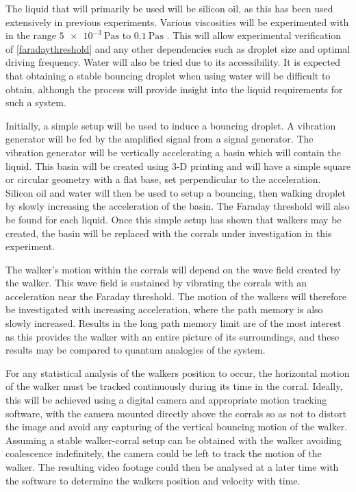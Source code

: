 \documentclass[11pt]{article}
\begin{document}
The liquid that will primarily be used will be silicon oil, as this has been used extensively in previous experiments.  Various viscosities will be experimented with in the range $\SI{5e-3}{\pascal\second}$ to $\SI{0.1}{\pascal\second}$ \cite{9}.  This will allow experimental verification of \eqref{faradaythreshold} and any other dependencies such as droplet size and optimal driving frequency.
Water will also be tried due to its accessibility.  It is expected that obtaining a stable bouncing droplet when using water will be difficult to obtain, although the process will provide insight into the liquid requirements for such a system.

Initially, a simple setup will be used to induce a bouncing droplet.  A vibration generator will be fed by the amplified signal from a signal generator.  The vibration generator will be vertically accelerating a basin which will contain the liquid.  This basin will be created using 3-D printing and will have a simple square or circular geometry with a flat base, set perpendicular to the acceleration.  Silicon oil and water will then be used to setup a bouncing, then walking droplet by slowly increasing the acceleration of the basin.  The Faraday threshold will also be found for each liquid.  Once this simple setup has shown that walkers may be created, the basin will be replaced with the corrals under investigation in this experiment.

The walker's motion within the corrals will depend on the wave field created by the walker.  This wave field is sustained by vibrating the corrals with an acceleration near the Faraday threshold.  The motion  of the walkers will therefore be investigated with increasing acceleration, where the path memory is also slowly increased.  Results in the long path memory limit are of the most interest as this provides the walker with an entire picture of its surroundings, and these results may be compared to quantum analogies of the system.

For any statistical analysis of the walkers position to occur, the horizontal motion of the walker must be tracked continuously during its time in the corral.  Ideally, this will be achieved using a digital camera and appropriate motion tracking software, with the camera mounted directly above the corrals so as not to distort the image and avoid any capturing of the vertical bouncing motion of the walker.  Assuming a stable walker-corral setup can be obtained with the walker avoiding coalescence indefinitely, the camera could be left to track the motion of the walker.  The resulting video footage could then be analysed at a later time with the software to determine the walkers position and velocity with time.
\end{document}
